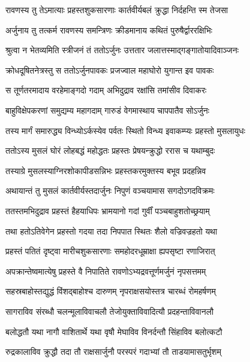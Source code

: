 \twolineshloka
{रावणस्य तु तेऽमात्याः प्रहस्तशुकसारणाः}
{कार्तवीर्यबलं क्रुद्धा निर्दहन्ति स्म तेजसा} %

\twolineshloka
{अर्जुनाय तु तत्कर्म रावणस्य समन्त्रिणः}
{क्रीडमानाय कथितं पुरुषैर्द्वाररक्षिभिः} %

\twolineshloka
{श्रुत्वा न भेतव्यमिति स्त्रीजनं तं ततोऽर्जुनः}
{उत्ततार जलात्तस्माद्गङ्गातोयादिवाञ्जनः} %

\twolineshloka
{क्रोधदूषितनेत्रस्तु स ततोऽर्जुनपावकः}
{प्रजज्वाल महाघोरो युगान्त इव पावकः} %

\twolineshloka
{स तूर्णतरमादाय वरहेमाङ्गदो गदाम्}
{अभिदुद्राव रक्षांसि तमांसीव दिवाकरः} %

\twolineshloka
{बाहुविक्षेपकरणां समुद्यम्य महागदाम्}
{गारुडं वेगमास्थाय चापपातैव सोऽर्जुनः} %

\twolineshloka
{तस्य मार्गं समारुद्ध्य विन्ध्योऽर्कस्येव पर्वतः}
{स्थितो विन्ध्य इवाकम्प्यः प्रहस्तो मुसलायुधः} %

\twolineshloka
{ततोऽस्य मुसलं घोरं लोहबद्धं महोद्धतः}
{प्रहस्तः प्रेषयन्क्रुद्धो ररास च यथाम्बुदः} %

\twolineshloka
{तस्याग्रे मुसलस्याग्निरशोकापीडसन्निभः}
{प्रहस्तकरमुक्तस्य बभूव प्रदहन्निव} %

\twolineshloka
{अथायान्तं तु मुसलं कार्तवीर्यस्तदार्जुनः}
{निपुणं वञ्चयामास सगदोऽगदविक्रमः} %

\twolineshloka
{ततस्तमभिदुद्राव प्रहस्तं हैहयाधिपः}
{भ्रामयानो गदां गुर्वीं पञ्चबाहुशतोच्छ्रयाम्} %

\twolineshloka
{तथा हतोऽतिवेगेन प्रहस्तो गदया तदा}
{निपपात स्थितः शैलो वज्रिवज्रहतो यथा} %

\twolineshloka
{प्रहस्तं पतितं दृष्ट्वा मारीचशुकसारणाः}
{समहोदरधूम्राक्षा ह्यपसृष्टा रणाजिरात्} %

\twolineshloka
{अपक्रान्तेष्वमात्येषु प्रहस्ते वै निपातिते}
{रावणोऽभ्यद्रवत्तूर्णमर्जुनं नृपसत्तमम्} %

\twolineshloka
{सहस्रबाहोस्तद्युद्धं विंशद्बाहोश्च दारुणम्}
{नृपराक्षसयोस्तत्र चारब्धं रोमहर्षणम्} %

\twolineshloka
{सागराविव संरब्धौ चलन्मूलाविवाचलौ}
{तेजोयुक्ताविवादित्यौ प्रदहन्ताविवानलौ} %

\twolineshloka
{बलोद्धतौ यथा नागौ वाशितार्थे यथा वृषौ}
{मेघाविव विनर्दन्तौ सिंहाविव बलोत्कटौ} %

\twolineshloka
{रुद्रकालाविव क्रुद्धौ तदा तौ राक्षसार्जुनौ}
{परस्परं गदाभ्यां तौ ताडयामासतुर्भृशम्} %

